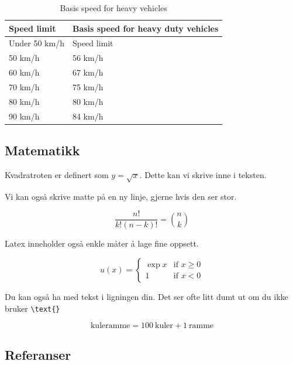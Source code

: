 \documentclass[a4paper]{article}
\begin{document}
\begin{table}[h!]
    \centering
    \begin{tabular}{| l | l |}
    \hline
    Speed limit & Basis speed for heavy duty vehicles \\ \hline \hline
    Under 50 km/h & Speed limit \\ \hline
    50 km/h & 56 km/h \\ \hline
    60 km/h & 67 km/h \\ \hline
    70 km/h & 75 km/h \\ \hline
    80 km/h & 80 km/h \\ \hline
    90 km/h & 84 km/h \\ \hline
    \end{tabular}
    \caption{Basis speed for heavy vehicles}
    \label{table:referencespeed}
\end{table}


\subsection{Matematikk}

Kvadratroten er definert som $y = \sqrt{x}$. Dette kan vi skrive inne i teksten.

Vi kan også skrive matte på en ny linje, gjerne hvis den ser stor.

\begin{equation} \label{eq:combinatorics}
    \frac{n!}{k!(n-k)!} = \binom{n}{k}    
\end{equation}

Latex inneholder også enkle måter å lage fine oppsett.

\begin{equation*}
u(x) = 
    \begin{cases} 
        \exp{x} & \text{if } x \geq 0 \\
        1       & \text{if } x < 0
    \end{cases}    
\end{equation*}

Du kan også ha med tekst i ligningen din. Det ser ofte litt dumt ut om du ikke bruker \verb:\text{}:

\begin{equation}
    \text{kuleramme} = 100~\text{kuler} + 1~\text{ramme}
\end{equation}

\subsection{Referanser}
\end{document}
